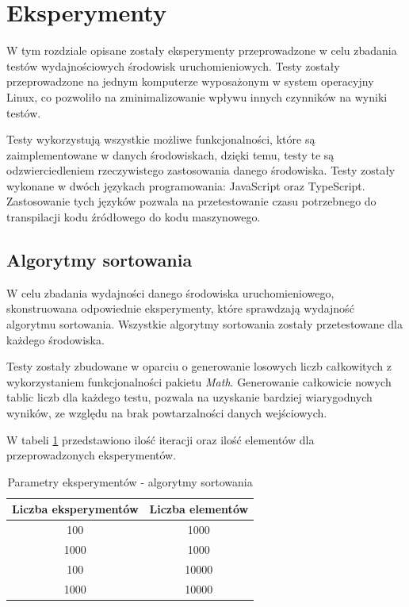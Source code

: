 \section{Eksperymenty}\label{sec:experiments}
W tym rozdziale opisane zostały eksperymenty przeprowadzone w celu zbadania testów wydajnościowych środowisk uruchomieniowych. Testy zostały przeprowadzone na jednym komputerze wyposażonym w system operacyjny Linux, co pozwoliło na zminimalizowanie wpływu innych czynników na wyniki testów.

Testy wykorzystują wszystkie możliwe funkcjonalności, które są zaimplementowane w danych środowiskach, dzięki temu, testy te są odzwierciedleniem rzeczywistego zastosowania danego środowiska. Testy zostały wykonane w dwóch językach programowania: JavaScript oraz TypeScript. Zastosowanie tych języków pozwala na przetestowanie czasu potrzebnego do transpilacji kodu źródłowego do kodu maszynowego. 

\subsection{Algorytmy sortowania}
W celu zbadania wydajności danego środowiska uruchomieniowego, skonstruowana odpowiednie eksperymenty, które sprawdzają wydajność algorytmu sortowania. Wszystkie algorytmy sortowania zostały przetestowane dla każdego środowiska.

Testy zostały zbudowane w oparciu o generowanie losowych liczb całkowitych z wykorzystaniem funkcjonalności pakietu \textit{Math}. Generowanie całkowicie nowych tablic liczb dla każdego testu, pozwala na uzyskanie bardziej wiarygodnych wyników, ze względu na brak powtarzalności danych wejściowych.

W tabeli \ref{tab:sorting_experiments} przedstawiono ilość iteracji oraz ilość elementów dla przeprowadzonych eksperymentów.

\begin{table}[H]
  \centering
  \caption{Parametry eksperymentów - algorytmy sortowania \cite{sorting}}
  \begin{tabular}{|c|c|}
    \hline
    \textbf{Liczba eksperymentów} & \textbf{Liczba elementów} \\ \hline
    100 & 1000 \\ \hline
    1000 & 1000 \\ \hline
    100 & 10000 \\ \hline
    1000 & 10000 \\ \hline
  \end{tabular}
  \label{tab:sorting_experiments}
\end{table}

